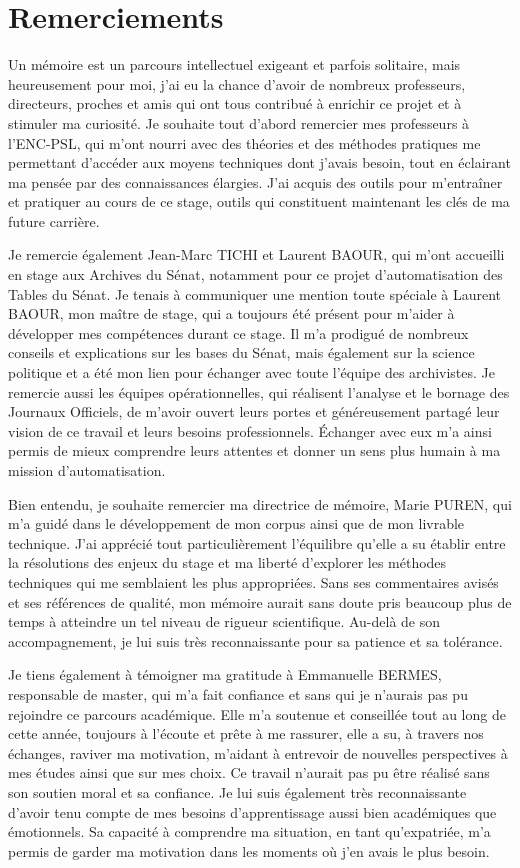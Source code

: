 \chapter*{Remerciements}

Un mémoire est un parcours intellectuel exigeant et parfois solitaire, mais heureusement pour moi, j'ai eu la chance d'avoir de nombreux professeurs, directeurs, proches et amis qui ont tous contribué à enrichir ce projet et à stimuler ma curiosité. 
Je souhaite tout d'abord remercier mes professeurs à l'ENC-PSL, qui m'ont nourri avec des théories et des méthodes pratiques me permettant d'accéder aux moyens techniques dont j'avais besoin, tout en éclairant ma pensée par des connaissances élargies. J'ai acquis des outils pour m'entraîner et pratiquer au cours de ce stage, outils qui constituent maintenant les clés de ma future carrière.

Je remercie également Jean-Marc TICHI et Laurent BAOUR, qui m'ont accueilli en stage aux Archives du Sénat, notamment pour ce projet d'automatisation des Tables du Sénat. Je tenais à communiquer une mention toute spéciale à Laurent BAOUR, mon maître de stage, qui a toujours été présent pour m'aider à développer mes compétences durant ce stage. Il m'a prodigué de nombreux conseils et explications sur les bases du Sénat, mais également sur la science politique et a été mon lien pour échanger avec toute l'équipe des archivistes. Je remercie aussi les équipes opérationnelles, qui réalisent l'analyse et le bornage des Journaux Officiels, de m'avoir ouvert leurs portes et généreusement partagé leur vision de ce travail et leurs besoins professionnels. Échanger avec eux m'a ainsi permis de mieux comprendre leurs attentes et donner un sens plus humain à ma mission d'automatisation.

Bien entendu, je souhaite remercier ma directrice de mémoire, Marie PUREN, qui m'a guidé dans le développement de mon corpus ainsi que de mon livrable technique. J'ai apprécié tout particulièrement l'équilibre qu'elle a su établir entre la résolutions des enjeux du stage et ma liberté d'explorer les méthodes techniques qui me semblaient les plus appropriées. Sans ses commentaires avisés et ses références de qualité, mon mémoire aurait sans doute pris beaucoup plus de temps à atteindre un tel niveau de rigueur scientifique. Au-delà de son accompagnement, je lui suis très reconnaissante pour sa patience et sa tolérance.

Je tiens également à témoigner ma gratitude à Emmanuelle BERMES, responsable de master, qui m'a fait confiance et sans qui je n'aurais pas pu rejoindre ce parcours académique. Elle m'a soutenue et conseillée tout au long de cette année, toujours à l'écoute et prête à me rassurer, elle a su, à travers nos échanges, raviver ma motivation, m'aidant à entrevoir de nouvelles perspectives à mes études ainsi que sur mes choix. Ce travail n'aurait pas pu être réalisé sans son soutien moral et sa confiance. Je lui suis également très reconnaissante d'avoir tenu compte de mes besoins d'apprentissage aussi bien académiques que émotionnels. Sa capacité à comprendre ma situation, en tant qu'expatriée, m'a permis de garder ma motivation dans les moments où j'en avais le plus besoin.

